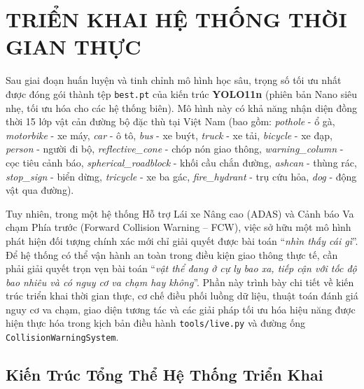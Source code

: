 
\section{TRIỂN KHAI HỆ THỐNG THỜI GIAN THỰC}
\label{sec:trien_khai_he_thong}

Sau giai đoạn huấn luyện và tinh chỉnh mô hình học sâu, trọng số tối ưu nhất được đóng gói thành tệp \texttt{best.pt} của kiến trúc \textbf{YOLO11n} (phiên bản Nano siêu nhẹ, tối ưu hóa cho các hệ thống biên). Mô hình này có khả năng nhận diện đồng thời 15 lớp vật cản đường bộ đặc thù tại Việt Nam (bao gồm: \textit{pothole} - ổ gà, \textit{motorbike} - xe máy, \textit{car} - ô tô, \textit{bus} - xe buýt, \textit{truck} - xe tải, \textit{bicycle} - xe đạp, \textit{person} - người đi bộ, \textit{reflective\_cone} - chóp nón giao thông, \textit{warning\_column} - cọc tiêu cảnh báo, \textit{spherical\_roadblock} - khối cầu chắn đường, \textit{ashcan} - thùng rác, \textit{stop\_sign} - biển dừng, \textit{tricycle} - xe ba gác, \textit{fire\_hydrant} - trụ cứu hỏa, \textit{dog} - động vật qua đường).

Tuy nhiên, trong một hệ thống Hỗ trợ Lái xe Nâng cao (ADAS) và Cảnh báo Va chạm Phía trước (Forward Collision Warning -- FCW), việc sở hữu một mô hình phát hiện đối tượng chính xác mới chỉ giải quyết được bài toán ``\textit{nhìn thấy cái gì}''. Để hệ thống có thể vận hành an toàn trong điều kiện giao thông thực tế, cần phải giải quyết trọn vẹn bài toán ``\textit{vật thể đang ở cự ly bao xa, tiếp cận với tốc độ bao nhiêu và có nguy cơ va chạm hay không}''. Phần này trình bày chi tiết về kiến trúc triển khai thời gian thực, cơ chế điều phối luồng dữ liệu, thuật toán đánh giá nguy cơ va chạm, giao diện tương tác và các giải pháp tối ưu hóa hiệu năng được hiện thực hóa trong kịch bản điều hành \texttt{tools/live.py} và đường ống \texttt{CollisionWarningSystem}.

\subsection{Kiến Trúc Tổng Thể Hệ Thống Triển Khai}
\label{subsec:kien_truc_tong_the}

